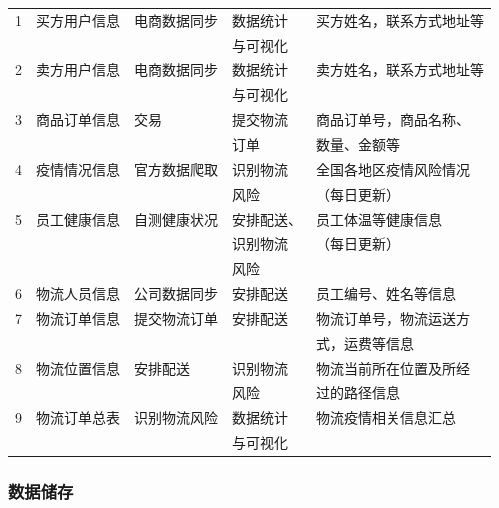 \documentclass[12pt]{article}
\begin{document}
\begin{center}
\begin{supertabular}{lllll}
	1 & 买方用户信息 &	电商数据同步 &	数据统计 &	买方姓名，联系方式地址等 \\&&& 与可视化 & \\
	2 &	卖方用户信息 & 电商数据同步 &	数据统计 &	卖方姓名，联系方式地址等\\&&& 与可视化 & \\
	3 &	商品订单信息 & 交易 &	提交物流 &	商品订单号，商品名称、 \\ &&&订单& 数量、金额等 \\
	4 &	疫情情况信息 &	官方数据爬取	& 识别物流 &	全国各地区疫情风险情况 \\ &&& 风险 & （每日更新）\\
	5 &	员工健康信息 &	自测健康状况 &	安排配送、 &	员工体温等健康信息 \\ &&& 识别物流 &（每日更新）\\ &&& 风险 &\\
	6 &	物流人员信息 &	公司数据同步 &	安排配送 &	员工编号、姓名等信息 \\
	7 &	物流订单信息 &	提交物流订单	& 安排配送 & 	物流订单号，物流运送方\\ &&&& 式，运费等信息 \\
	8 &	物流位置信息 & 安排配送 &	识别物流 &	物流当前所在位置及所经 \\ &&& 风险 & 过的路径信息 \\
	9 & 物流订单总表 & 识别物流风险 & 数据统计 & 物流疫情相关信息汇总 \\ &&  & 与可视化 & \\
\end{supertabular}
\end{center}

\subsubsection{数据储存}

\tabletail{\bottomrule}
\end{document}
